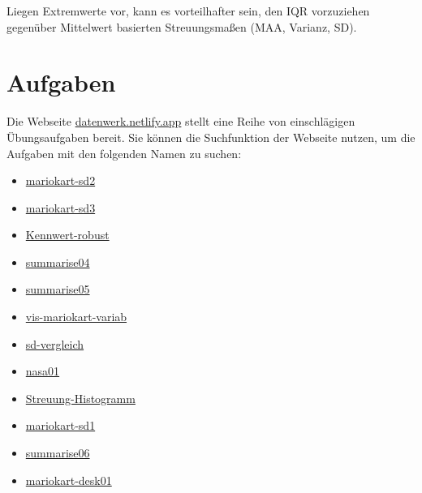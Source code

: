 \documentclass[
  letterpaper,
  twoside,
  open=any]{scrbook}
\providecommand{\tightlist}{%
  \setlength{\itemsep}{0pt}\setlength{\parskip}{0pt}}\usepackage{longtable,booktabs,array}
\theoremstyle{definition}
\theoremstyle{definition}
\theoremstyle{definition}
\theoremstyle{remark}
\begin{document}
Liegen Extremwerte vor, kann es vorteilhafter sein, den IQR vorzuziehen
gegenüber Mittelwert basierten Streuungsmaßen (MAA, Varianz, SD).

\section{Aufgaben}\label{aufgaben-5}

Die Webseite \href{https://datenwerk.netlify.app}{datenwerk.netlify.app}
stellt eine Reihe von einschlägigen Übungsaufgaben bereit. Sie können
die Suchfunktion der Webseite nutzen, um die Aufgaben mit den folgenden
Namen zu suchen:

\begin{itemize}
\tightlist
\item
  \href{https://sebastiansauer.github.io/Datenwerk/posts/mariokart-sd2/mariokart-sd2}{mariokart-sd2}
\item
  \href{https://sebastiansauer.github.io/Datenwerk/posts/mariokart-sd3/mariokart-sd3}{mariokart-sd3}
\item
  \href{https://sebastiansauer.github.io/Datenwerk/posts/kennwert-robust/kennwert-robust}{Kennwert-robust}
\item
  \href{https://sebastiansauer.github.io/Datenwerk/posts/summarise04/summarise04}{summarise04}
\item
  \href{https://sebastiansauer.github.io/Datenwerk/posts/summarise05/summarise05}{summarise05}
\item
  \href{https://sebastiansauer.github.io/Datenwerk/posts/vis-mariokart-variab/vis-mariokart-variab}{vis-mariokart-variab}
\item
  \href{https://sebastiansauer.github.io/Datenwerk/posts/sd-vergleich/sd-vergleich}{sd-vergleich}
\item
  \href{https://sebastiansauer.github.io/Datenwerk/posts/nasa01/nasa01}{nasa01}
\item
  \href{https://sebastiansauer.github.io/Datenwerk/posts/streuung-histogramm/streuung-histogramm}{Streuung-Histogramm}
\item
  \href{https://sebastiansauer.github.io/Datenwerk/posts/mariokart-sd1/mariokart-sd1}{mariokart-sd1}
\item
  \href{https://sebastiansauer.github.io/Datenwerk/posts/summarise06/summarise06}{summarise06}
\item
  \href{https://sebastiansauer.github.io/Datenwerk/posts/mariokart-desk01/mariokart-desk01}{mariokart-desk01}
\end{itemize}
\end{document}
